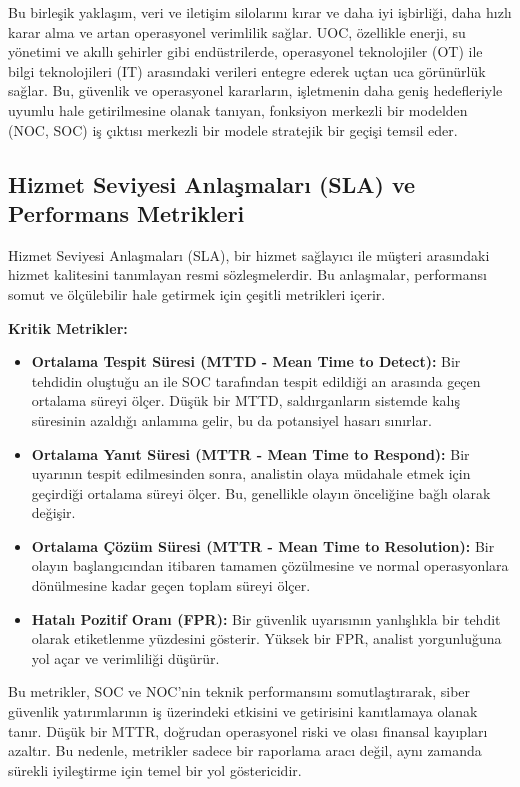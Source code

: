 Bu birleşik yaklaşım, veri ve iletişim silolarını kırar ve daha iyi işbirliği, daha hızlı karar alma ve artan operasyonel verimlilik sağlar. UOC, özellikle enerji, su yönetimi ve akıllı şehirler gibi endüstrilerde, operasyonel teknolojiler (OT) ile bilgi teknolojileri (IT) arasındaki verileri entegre ederek uçtan uca görünürlük sağlar. Bu, güvenlik ve operasyonel kararların, işletmenin daha geniş hedefleriyle uyumlu hale getirilmesine olanak tanıyan, fonksiyon merkezli bir modelden (NOC, SOC) iş çıktısı merkezli bir modele stratejik bir geçişi temsil eder.

\subsection{Hizmet Seviyesi Anlaşmaları (SLA) ve Performans Metrikleri}

Hizmet Seviyesi Anlaşmaları (SLA), bir hizmet sağlayıcı ile müşteri arasındaki hizmet kalitesini tanımlayan resmi sözleşmelerdir. Bu anlaşmalar, performansı somut ve ölçülebilir hale getirmek için çeşitli metrikleri içerir.

\textbf{Kritik Metrikler:}

\begin{itemize}
    \item \textbf{Ortalama Tespit Süresi (MTTD - Mean Time to Detect):} Bir tehdidin oluştuğu an ile SOC tarafından tespit edildiği an arasında geçen ortalama süreyi ölçer. Düşük bir MTTD, saldırganların sistemde kalış süresinin azaldığı anlamına gelir, bu da potansiyel hasarı sınırlar.
    \item \textbf{Ortalama Yanıt Süresi (MTTR - Mean Time to Respond):} Bir uyarının tespit edilmesinden sonra, analistin olaya müdahale etmek için geçirdiği ortalama süreyi ölçer. Bu, genellikle olayın önceliğine bağlı olarak değişir.
    \item \textbf{Ortalama Çözüm Süresi (MTTR - Mean Time to Resolution):} Bir olayın başlangıcından itibaren tamamen çözülmesine ve normal operasyonlara dönülmesine kadar geçen toplam süreyi ölçer.
    \item \textbf{Hatalı Pozitif Oranı (FPR):} Bir güvenlik uyarısının yanlışlıkla bir tehdit olarak etiketlenme yüzdesini gösterir. Yüksek bir FPR, analist yorgunluğuna yol açar ve verimliliği düşürür.
\end{itemize}

Bu metrikler, SOC ve NOC'nin teknik performansını somutlaştırarak, siber güvenlik yatırımlarının iş üzerindeki etkisini ve getirisini kanıtlamaya olanak tanır. Düşük bir MTTR, doğrudan operasyonel riski ve olası finansal kayıpları azaltır. Bu nedenle, metrikler sadece bir raporlama aracı değil, aynı zamanda sürekli iyileştirme için temel bir yol göstericidir.

